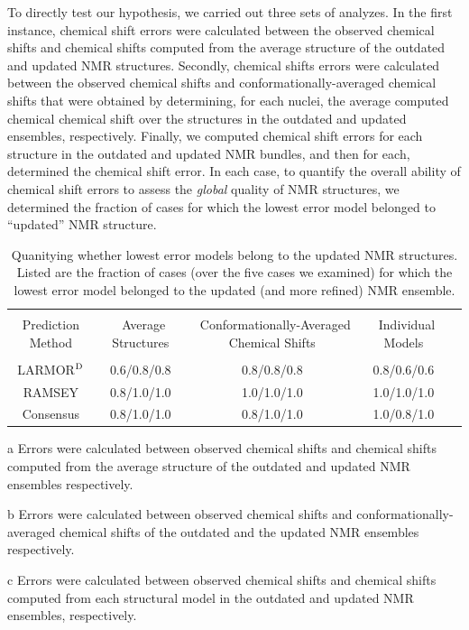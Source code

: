 \documentclass[fleqn,10pt]{wlscirep}
\begin{document}
To directly test our hypothesis, we carried out three sets of analyzes. In the first instance, chemical shift errors were calculated between the observed chemical shifts and chemical shifts computed from the average structure of the outdated and updated NMR structures. Secondly, chemical shifts errors were calculated between the observed chemical shifts and conformationally-averaged chemical shifts that were obtained by determining, for each nuclei, the average computed chemical chemical shift over the structures in the outdated and updated ensembles, respectively. Finally, we computed chemical shift errors for each structure in the outdated and updated NMR bundles, and then for each, determined the chemical shift error. In each case, to quantify the overall ability of chemical shift errors to assess the \textit{global} quality of NMR structures, we determined the fraction of cases for which the lowest error model belonged to ``updated'' NMR structure. 
\begin{table}[h]
\centering
\begin{threeparttable}
\begin{tabular}{c c c c c}
\hline
\\
Prediction Method  & \tnote{a} \ Average Structures & \tnote{b} \ Conformationally-Averaged Chemical Shifts &  \tnote{c} \ Individual Models \\
\\
\hline
LARMOR$^{\rm D}$ & 0.6/0.8/0.8 & 0.8/0.8/0.8 & 0.8/0.6/0.6 \\
RAMSEY & 0.8/1.0/1.0 & 1.0/1.0/1.0 & 1.0/1.0/1.0 \\
Consensus & 0.8/1.0/1.0 & 0.8/1.0/1.0 & 1.0/0.8/1.0 \\
\hline
\end{tabular}
\begin{tablenotes}
\item[a] Errors were calculated between observed chemical shifts and chemical shifts computed from the average structure of the outdated and updated NMR ensembles respectively. 
\item[b] Errors were calculated between observed chemical shifts and conformationally-averaged chemical shifts of the outdated and the updated NMR ensembles respectively. 
\item[c] Errors were calculated between observed chemical shifts and chemical shifts computed from each structural model in the outdated and updated NMR ensembles, respectively.
\end{tablenotes}
\end{threeparttable}
\caption{\label{tab:tpr} Quanitying whether lowest error models belong to the updated NMR structures. Listed are the fraction of cases (over the five cases we examined) for which the lowest error model belonged to the updated (and more refined) NMR ensemble.}
\end{table}
\end{document}
